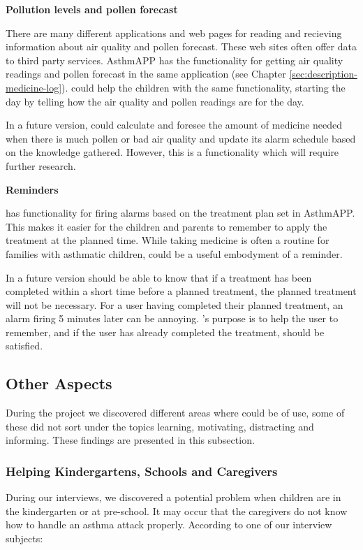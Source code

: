 \textbf{Pollution levels and pollen forecast}

There are many different applications and web pages for reading and recieving information about air quality and pollen forecast. These web sites often offer data to third party services. AsthmAPP has the functionality for getting air quality readings and pollen forecast in the same application (see Chapter \ref{sec:description-medicine-log}).
\buddy{} could help the children with the same functionality, starting the day by telling how the air quality and pollen readings are for the day. 

In a future version, \buddy{} could calculate and foresee the amount of medicine needed when there is much pollen or bad air quality and update its alarm schedule based on the knowledge gathered. However, this is a functionality which will require further research.


\textbf{Reminders}

\buddy{} has functionality for firing alarms based on the treatment plan set in AsthmAPP. This makes it easier for the children and parents to remember to apply the treatment at the planned time. While taking medicine is often a routine for families with asthmatic children, \buddy{} could be a useful embodyment of a reminder. 

In a future version \buddy{} should be able to know that if a treatment has been completed within a short time before a planned treatment, the planned treatment will not be necessary. For a user having completed their planned treatment, an alarm firing 5 minutes later can be annoying. \buddy{}'s purpose is to help the user to remember, and if the user has already completed the treatment, \ab{} should be satisfied. 


\subsection{Other Aspects}
\label{sec:otheraspects}
During the project we discovered different areas where \ab{} could be of use, some of these did not sort under the topics learning, motivating, distracting and informing. These findings are presented in this subsection.


\subsubsection{Helping Kindergartens, Schools and Caregivers}
\label{sec:helpingkindergartenschoolandcaregivers}
During our interviews, we discovered a potential problem when children are in the kindergarten or at pre-school. It may occur that the caregivers do not know how to handle an asthma attack properly. According to one of our interview subjects: 

